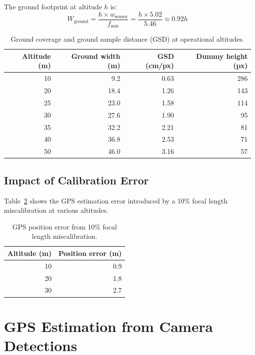 The ground footprint at altitude $h$ is:
\begin{equation}
    W_\text{ground} = \frac{h \times w_\text{sensor}}{f_\text{mm}}
    = \frac{h \times 5.02}{5.46} \approx 0.92h
    \label{eq:ground-width}
\end{equation}

\begin{table}[htbp]
\centering
\caption{Ground coverage and ground sample distance (GSD) at operational altitudes.}
\label{tab:ground-coverage}
\begin{tabular}{rrrr}
\hline
\textbf{Altitude (m)} & \textbf{Ground width (m)} & \textbf{GSD (cm/px)} &
\textbf{Dummy height (px)} \\
\hline
10  & 9.2   & 0.63 & 286 \\
20  & 18.4  & 1.26 & 143 \\
25  & 23.0  & 1.58 & 114 \\
30  & 27.6  & 1.90 & 95 \\
35  & 32.2  & 2.21 & 81 \\
40  & 36.8  & 2.53 & 71 \\
50  & 46.0  & 3.16 & 57 \\
\hline
\end{tabular}
\end{table}

\subsection{Impact of Calibration Error}

Table~\ref{tab:fov-error} shows the GPS estimation error introduced by a 10\%
focal length miscalibration at various altitudes.

\begin{table}[htbp]
\centering
\caption{GPS position error from 10\% focal length miscalibration.}
\label{tab:fov-error}
\begin{tabular}{rr}
\hline
\textbf{Altitude (m)} & \textbf{Position error (m)} \\
\hline
10 & 0.9 \\
20 & 1.8 \\
30 & 2.7 \\
\hline
\end{tabular}
\end{table}


\section{GPS Estimation from Camera Detections}
\label{sec:gps-estimation}

